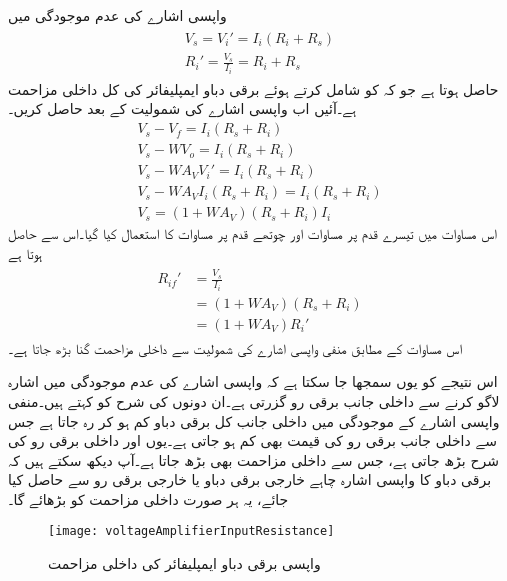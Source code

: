 واپسی اشارے کی عدم موجودگی میں
\begin{gather} \label{مساوات_واپسی_بغیر_واپسی_دباو_ایمپلیفائر_داخلی_مزاحمت}
\begin{aligned}
V_s =V_i'= I_i \left (R_i +R_s \right ) \\
R_i'=\frac{V_s}{I_i}=R_i+R_s
\end{aligned}
\end{gather}
حاصل ہوتا ہے جو کہ  کو شامل کرتے ہوئے برقی دباو ایمپلیفائر کی کل داخلی مزاحمت  ہے۔آئیں اب واپسی اشارے کی شمولیت کے بعد  حاصل کریں۔
\begin{align*}
V_s-V_f=I_i \left (R_s+R_i \right )  \\
V_s - W V_o = I_i \left (R_s+R_i \right )  \\
V_s-W A_V V_i'=I_i \left (R_s+R_i \right ) \\
V_s-W A_V I_i \left (R_s+R_i \right ) =I_i \left (R_s+R_i \right ) \\
V_s=\left(1+W A_V \right ) \left (R_s+R_i \right ) I_i
\end{align*}
اس مساوات میں تیسرے قدم پر مساوات  اور چوتھے قدم پر مساوات   کا استعمال کیا گیا۔اس سے حاصل ہوتا ہے
\begin{gather}
\begin{aligned}\label{مساوات_واپسی_برقی_دباو_کی_داخلی_مزاحمت}
R_{if}' &=\frac{V_s}{I_i} \\
&=\left(1+W A_V \right ) \left (R_s+R_i \right ) \\
&=\left(1+W A_V \right ) R_i'
\end{aligned}
\end{gather}
اس مساوات کے مطابق منفی واپسی اشارے کی شمولیت  سے داخلی مزاحمت  گنا بڑھ جاتا ہے۔

اس نتیجے کو یوں سمجھا جا سکتا ہے کہ واپسی اشارے کی عدم موجودگی میں اشارہ  لاگو کرنے سے داخلی جانب برقی رو گزرتی ہے۔ان دونوں کی شرح کو  کہتے ہیں۔منفی واپسی اشارے کے موجودگی میں داخلی جانب کل برقی دباو کم ہو کر   رہ جاتا ہے جس سے داخلی جانب برقی رو کی قیمت بھی کم ہو جاتی ہے۔یوں  اور داخلی برقی رو کی شرح بڑھ جاتی ہے، جس سے داخلی مزاحمت بھی بڑھ جاتا ہے۔آپ دیکھ سکتے ہیں کہ برقی دباو کا واپسی اشارہ چاہے خارجی برقی دباو یا خارجی برقی رو سے حاصل کیا جائے، یہ  ہر صورت داخلی مزاحمت کو بڑھائے گا۔
\begin{figure}
\centering
\texttt{[image: voltageAmplifierInputResistance]}
\caption{واپسی برقی دباو ایمپلیفائر کی داخلی مزاحمت}
\label{شکل_واپسی_دباو_ایمپلیفائر_داخلی_مزاحمت}
\end{figure}

